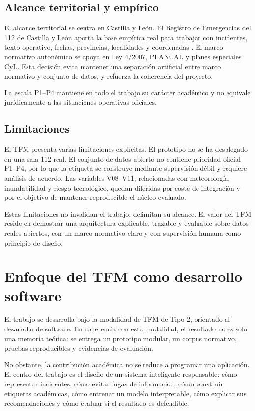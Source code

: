 \subsection{Alcance territorial y empírico}

El alcance territorial se centra en Castilla y León. El Registro de Emergencias del 112 de Castilla y León aporta la base empírica real para trabajar con incidentes, texto operativo, fechas, provincias, localidades y coordenadas \cite{Registro112CyL}. El marco normativo autonómico se apoya en Ley 4/2007, PLANCAL y planes especiales CyL. Esta decisión evita mantener una separación artificial entre marco normativo y conjunto de datos, y refuerza la coherencia del proyecto.

La escala P1--P4 mantiene en todo el trabajo su carácter académico y no equivale jurídicamente a las situaciones operativas oficiales.

\subsection{Limitaciones}

El TFM presenta varias limitaciones explícitas. El prototipo no se ha desplegado en una sala 112 real. El conjunto de datos abierto no contiene prioridad oficial P1--P4, por lo que la etiqueta se construye mediante supervisión débil y requiere análisis de acuerdo. Las variables V08--V11, relacionadas con meteorología, inundabilidad y riesgo tecnológico, quedan diferidas por coste de integración y por el objetivo de mantener reproducible el núcleo evaluado.

Estas limitaciones no invalidan el trabajo; delimitan su alcance. El valor del TFM reside en demostrar una arquitectura explicable, trazable y evaluable sobre datos reales abiertos, con un marco normativo claro y con supervisión humana como principio de diseño.

\section{Enfoque del TFM como desarrollo software}

El trabajo se desarrolla bajo la modalidad de TFM de Tipo 2, orientado al desarrollo de software. En coherencia con esta modalidad, el resultado no es solo una memoria teórica: se entrega un prototipo modular, un corpus normativo, pruebas reproducibles y evidencias de evaluación.

No obstante, la contribución académica no se reduce a programar una aplicación. El centro del trabajo es el diseño de un sistema inteligente responsable: cómo representar incidentes, cómo evitar fugas de información, cómo construir etiquetas académicas, cómo entrenar un modelo interpretable, cómo explicar sus recomendaciones y cómo evaluar si el resultado es defendible.

